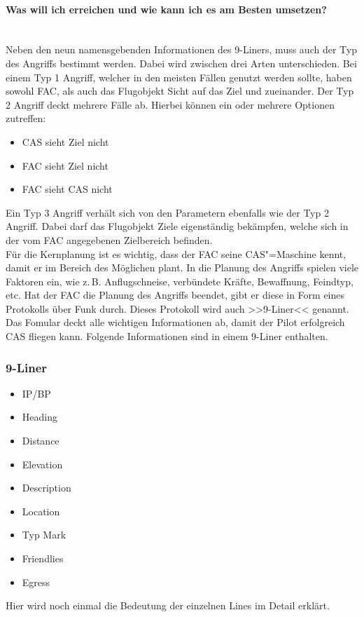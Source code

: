 \paragraph*{Was will ich erreichen und wie kann ich es am Besten umsetzen?}\hfil\\
Neben den neun namensgebenden Informationen des 9-Liners, muss auch der Typ des
Angriffs bestimmt werden. Dabei wird zwischen drei Arten unterschieden.
Bei einem Typ 1 Angriff, welcher in den meisten Fällen genutzt werden sollte, haben
sowohl FAC, als auch das Flugobjekt Sicht auf das Ziel und zueinander.
Der Typ 2 Angriff deckt mehrere Fälle ab. Hierbei können ein oder mehrere Optionen
zutreffen:
\begin{itemize}
	\item CAS sieht Ziel nicht
	\item FAC sieht Ziel nicht
	\item FAC sieht CAS nicht
\end{itemize}
Ein Typ 3 Angriff verhält sich von den Parametern ebenfalls wie der Typ 2 Angriff. Dabei
darf das Flugobjekt Ziele eigenständig bekämpfen, welche sich in der vom FAC
angegebenen Zielbereich befinden.\\
Für die Kernplanung ist es wichtig, dass der FAC seine CAS"=Maschine kennt, damit er im
Bereich des Möglichen plant. In die Planung des Angriffs spielen viele Faktoren ein, wie
z.\,B. Anflugschneise, verbündete Kräfte, Bewaffnung, Feindtyp, etc. Hat der FAC die
Planung des Angriffs beendet, gibt er diese in Form eines Protokolls über Funk durch.
Dieses Protokoll wird auch >>9-Liner<< genannt. Das Fomular deckt alle wichtigen
Informationen ab, damit der Pilot erfolgreich CAS fliegen kann. Folgende Informationen
sind in einem 9-Liner enthalten.

\subsubsection{9-Liner}
\begin{itemize}
	\item IP/BP
	\item Heading
	\item Distance
	\item Elevation
	\item Description
	\item Location
	\item Typ Mark
	\item Friendlies
	\item Egress
\end{itemize}
Hier wird noch einmal die Bedeutung der einzelnen Lines im Detail erklärt.
